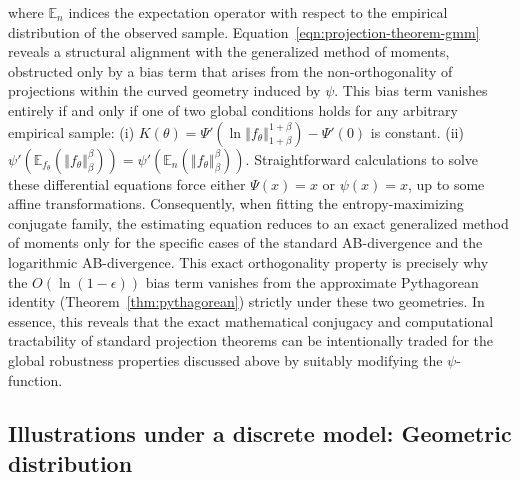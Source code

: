 \documentclass[11pt]{article}
\theoremstyle{plain}
\theoremstyle{remark}
\def\E{\mathbb{E}}
\newcommand{\norm}[1]{\left\Vert #1 \right\Vert}
\begin{document}
\noindent where $\E_n$ indices the expectation operator with respect to the empirical distribution of the observed sample. Equation~\eqref{eqn:projection-theorem-gmm} reveals a structural alignment with the generalized method of moments, obstructed only by a bias term that arises from the non-orthogonality of projections within the curved geometry induced by $\psi$. This bias term vanishes entirely if and only if one of two global conditions holds for any arbitrary empirical sample: (i) $K(\theta) = \Psi'(\ln \norm{f_\theta}_{1+\beta}^{1+\beta}) - \Psi'(0)$ is constant. (ii) $\psi'( \E_{f_\theta}(\norm{f_\theta}_\beta^\beta)) = \psi'( \E_n(\norm{f_\theta}_\beta^\beta))$. Straightforward calculations to solve these differential equations force either $\Psi(x) = x$ or $\psi(x) = x$, up to some affine transformations. Consequently, when fitting the entropy-maximizing conjugate family, the estimating equation reduces to an exact generalized method of moments only for the specific cases of the standard AB-divergence and the logarithmic AB-divergence. This exact orthogonality property is precisely why the $O(\ln(1-\epsilon))$ bias term vanishes from the approximate Pythagorean identity (Theorem~\ref{thm:pythagorean}) strictly under these two geometries. In essence, this reveals that the exact mathematical conjugacy and computational tractability of standard projection theorems can be intentionally traded for the global robustness properties discussed above by suitably modifying the $\psi$-function.

\subsection{Illustrations under a discrete model: Geometric distribution}\label{sec:empirical-geom}
\end{document}
